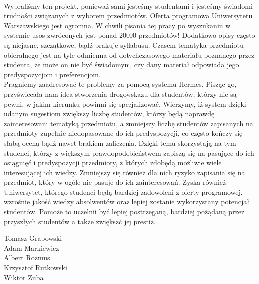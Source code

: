 \documentclass[licencjacka]{pracamgr}
\begin{document}
~\\ \indent Wybraliśmy ten projekt, ponieważ sami jesteśmy studentami i jesteśmy świadomi trudności związanych z wyborem przedmiotów. Oferta programowa Uniwersytetu Warszawskiego jest ogromna. W chwili pisania tej pracy po wyszukaniu w systemie usos zwróconych jest ponad 20000 przedmiotów! Dodatkowo opisy często są niejasne, szczątkowe, bądź brakuje syllabusu. Czasem tematyka przedmiotu obieralnego jest na tyle odmienna od dotychczasowego materiału poznanego przez studenta, że może on nie być świadomym, czy dany materiał odpowiada jego predyspozycjom i preferencjom.
\\ \indent Pragniemy zaadresować te problemy za pomocą systemu Hermes. Pisząc go, przyświecała nam idea stworzenia drogowskazu dla studentów, którzy nie są pewni, w jakim kierunku powinni się specjalizować. Wierzymy, iż system dzięki udanym sugestiom zwiększy liczbę studentów, którzy będą naprawdę zainteresowani tematyką przedmiotu, a zmniejszy liczbę studentów zapisanych na przedmioty zupełnie niedopasowane do ich predyspozycji, co często kończy się słabą oceną bądź nawet brakiem zaliczenia. Dzięki temu skorzystają na tym studenci, którzy z większym prawdopodobieństwem zapiszą się na pasujące do ich osiągnięć i predyspozycji przedmioty, z których zdobędą możliwie wiele interesującej ich wiedzy. Zmniejszy się również dla nich ryzyko zapisania się na przedmiot, który w ogóle nie pasuje do ich zainteresowań. Zyska również Uniwersytet, którego studenci będą bardziej zadowoleni z oferty programowej, wzrośnie jakość wiedzy absolwentów oraz lepiej zostanie wykorzystany potencjał studentów. Pomoże to uczelnii być lepiej postrzeganą, bardziej pożądaną przez przyszłych studentów a także zwiększć jej prestiż.
\\ 
\begin{flushright}
Tomasz Grabowski \\
Adam Markiewicz \\
Albert Rozmus \\
Krzysztof Rutkowski \\
Wiktor Zuba 
\end{flushright}
 
\end{document}
